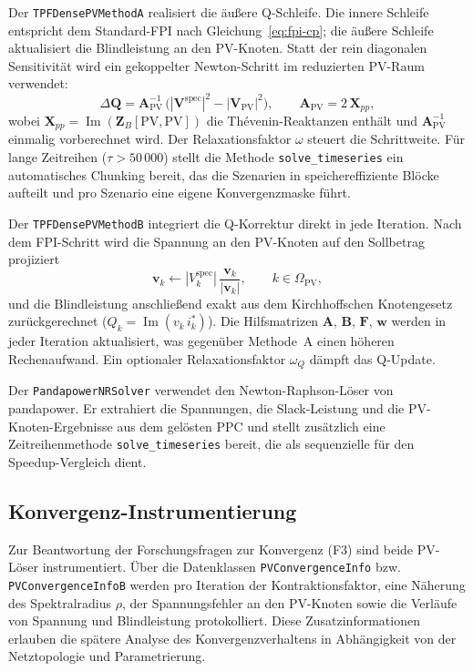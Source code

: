 Der \texttt{TPFDensePVMethodA} realisiert die äußere
Q-Schleife. Die innere Schleife entspricht dem Standard-FPI nach
Gleichung~\eqref{eq:fpi-cp}; die äußere Schleife aktualisiert die Blindleistung an den
PV-Knoten. Statt der rein diagonalen Sensitivität wird ein gekoppelter
Newton-Schritt im reduzierten PV-Raum verwendet:
\begin{equation}
	\Delta \mathbf{Q} = \mathbf{A}_{\mathrm{PV}}^{-1}\,\bigl(|\mathbf{V}^{\mathrm{spec}}|^{2} - |\mathbf{V}_{\mathrm{PV}}|^{2}\bigr),
	\qquad
	\mathbf{A}_{\mathrm{PV}} = 2\,\mathbf{X}_{pp},
\end{equation}
wobei $\mathbf{X}_{pp}=\operatorname{Im}(\mathbf{Z}_{B}[\text{PV},\text{PV}])$ die
Thévenin-Reaktanzen enthält und $\mathbf{A}_{\mathrm{PV}}^{-1}$ einmalig vorberechnet
wird. Der Relaxationsfaktor $\omega$ steuert die Schrittweite. Für lange Zeitreihen ($\tau > 50\,000$) stellt die
Methode \texttt{solve\_timeseries} ein automatisches Chunking bereit, das die
Szenarien in speichereffiziente Blöcke aufteilt und pro Szenario eine eigene
Konvergenzmaske führt.

Der \texttt{TPFDensePVMethodB} integriert die
Q-Korrektur direkt in jede Iteration. Nach dem FPI-Schritt wird die Spannung an den
PV-Knoten auf den Sollbetrag projiziert
\begin{equation}
	\mathbf{v}_k \leftarrow |V_k^{\mathrm{spec}}|\,\frac{\mathbf{v}_k}{|\mathbf{v}_k|},
	\qquad k \in \Omega_{\mathrm{PV}},
\end{equation}
und die Blindleistung anschließend exakt aus dem Kirchhoffschen Knotengesetz
zurückgerechnet ($Q_k = \operatorname{Im}(v_k\,i_k^{*})$). Die Hilfsmatrizen
$\mathbf{A}$, $\mathbf{B}$, $\mathbf{F}$, $\mathbf{w}$ werden in jeder Iteration
aktualisiert, was gegenüber Methode~A einen höheren Rechenaufwand. Ein optionaler Relaxationsfaktor $\omega_Q$ dämpft das Q-Update.

Der \texttt{PandapowerNRSolver} verwendet den
Newton-Raphson-Löser von pandapower. Er extrahiert die Spannungen, die Slack-Leistung
und die PV-Knoten-Ergebnisse aus dem gelösten PPC und stellt zusätzlich eine
Zeitreihenmethode \texttt{solve\_timeseries} bereit, die als sequenzielle  für
den Speedup-Vergleich dient.

\subsection{Konvergenz-Instrumentierung}

Zur Beantwortung der Forschungsfragen zur Konvergenz (F3) sind beide PV-Löser
instrumentiert. Über die Datenklassen \texttt{PVConvergenceInfo} bzw.
\texttt{PVConvergenceInfoB} werden pro Iteration der Kontraktionsfaktor, eine
Näherung des Spektralradius $\rho$, der Spannungsfehler an den PV-Knoten sowie die
Verläufe von Spannung und Blindleistung protokolliert. Diese Zusatzinformationen
erlauben die spätere Analyse des Konvergenzverhaltens in Abhängigkeit von der
Netztopologie und Parametrierung.

